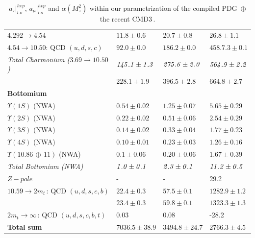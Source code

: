 \documentclass[review]{elsarticle}
\begin{document}
{\begin{table}[H]
\begin{center}
{\begin{tabular}{| llll |}
$4.292\to4.54$ & $11.8\pm 0.6$&$20.7\pm 0.8$&$26.8\pm 1.1$\\
$4.54\to10.50$:  QCD $(u,d,s,c)$ & $92.0\pm 0.0$&$186.2\pm 0.0$&$458.7.3\pm 0.1$\\
{\it Total Charmonium ($3.69\to 10.50$)}&$\it 145.1\pm 1.3$&$\it 275.6\pm 2.0$&$\it 564.9\pm 2.2$\\
\rowcolor{greenli}{ Total Charmonium }&$ 228.1\pm 1.9$&$396.5\pm 2.8$&$664.8\pm 2.7$\\
 {\bf Bottomium} &&&\\
$\Upsilon (1S)$ (NWA) &$0.54\pm 0.02$&$1.25\pm 0.07$&$5.65\pm 0.29$\\
$\Upsilon(2S)$ (NWA) &$0.22\pm 0.02$&$0.51\pm 0.06$&$2.54\pm 0.29$\\
$\Upsilon (3S)$ (NWA) &$0.14\pm 0.02$&$0.33\pm 0.04$&$1.77\pm 0.23$\\
$\Upsilon(4S)$ (NWA) &$0.10\pm 0.01$&$0.23\pm 0.03$&$1.26\pm 0.16$\\
$\Upsilon(10.86\,\oplus\,11)$ (NWA) &$0.1\pm 0.06$&$0.20\pm 0.06$&$1.67\pm 0.39$\\
{\it Total Bottomium (NWA)}&$\it1.0\pm 0.1$&$\it 2.3\pm 0.1$&$\it 11.2\pm 0.5$ \\
$Z-pole $&-&-&29.2\,\cite{YND17}\\
$10.59\to2m_t$\,:  QCD $(u,d,s,c,b)$ & $22.4\pm 0.3$&$57.5\pm 0.1$&$1282.9\pm 1.2$\\
\rowcolor{greenli}{Total Bottomium }&$ 23.4\pm 0.3$&$59.8\pm 0.1$&$1323.3\pm1.3$\\
$2m_t\to\infty$\,: QCD $(u,d,s,c,b,t)$&0.03&0.08&-28.2\\
\hline
\rowcolor{yellow}\bf Total sum &\boldmath$7036.5\pm 38.9$&\boldmath$3494.8\pm 24.7$&\boldmath$2766.3\pm 4.5$\\

   \hline\hline
 
\end{tabular}}
 \caption{ %
  $a_\tau\vert^{hvp}_{l.o}$, $a_\mu\vert^{hvp}_{l.o}$ and $\alpha(M^2_z)$ within our parametrization of the compiled PDG\,\cite{PDG} $\oplus$ the recent CMD3\,\cite{CMD3}. }\label{tab:amu1} 
 \end{center}
\end{table}
} 

\end{document}

